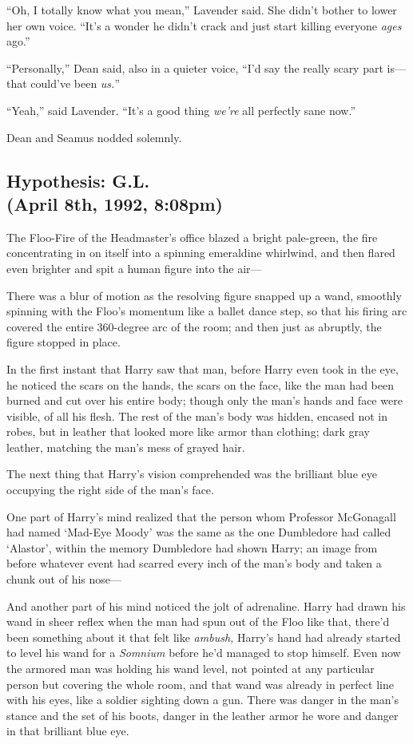 “Oh, I totally know what you mean,” Lavender said. She didn’t bother to lower her own voice. “It’s a wonder he didn’t crack and just start killing everyone \emph{ages} ago.”

“Personally,” Dean said, also in a quieter voice, “I’d say the really scary part is—that could’ve been \emph{us.}”

“Yeah,” said Lavender. “It’s a good thing \emph{we’re} all perfectly sane now.”

Dean and Seamus nodded solemnly.
\sbreak

\subsection{Hypothesis: G.L.\\(April 8th, 1992, 8:08pm)}

The Floo-Fire of the Headmaster’s office blazed a bright pale-green, the fire concentrating in on itself into a spinning emeraldine whirlwind, and then flared even brighter and spit a human figure into the air—

There was a blur of motion as the resolving figure snapped up a wand, smoothly spinning with the Floo’s momentum like a ballet dance step, so that his firing arc covered the entire 360-degree arc of the room; and then just as abruptly, the figure stopped in place.

In the first instant that Harry saw that man, before Harry even took in the eye, he noticed the scars on the hands, the scars on the face, like the man had been burned and cut over his entire body; though only the man’s hands and face were visible, of all his flesh. The rest of the man’s body was hidden, encased not in robes, but in leather that looked more like armor than clothing; dark gray leather, matching the man’s mess of grayed hair.

The next thing that Harry’s vision comprehended was the brilliant blue eye occupying the right side of the man’s face.

One part of Harry’s mind realized that the person whom Professor McGonagall had named ‘Mad-Eye Moody’ was the same as the one Dumbledore had called ‘Alastor’, within the memory Dumbledore had shown Harry; an image from before whatever event had scarred every inch of the man’s body and taken a chunk out of his nose—

And another part of his mind noticed the jolt of adrenaline. Harry had drawn his wand in sheer reflex when the man had spun out of the Floo like that, there’d been something about it that felt like \emph{ambush,} Harry’s hand had already started to level his wand for a \emph{Somnium} before he’d managed to stop himself. Even now the armored man was holding his wand level, not pointed at any particular person but covering the whole room, and that wand was already in perfect line with his eyes, like a soldier sighting down a gun. There was danger in the man’s stance and the set of his boots, danger in the leather armor he wore and danger in that brilliant blue eye.


